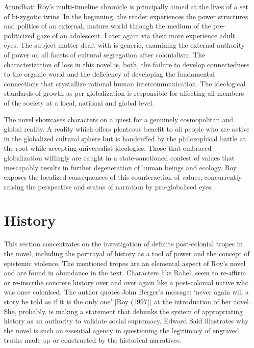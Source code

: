 Arundhati Roy’s multi-timeline chronicle is principally aimed at the lives of a set of bi-zygotic twins. In the beginning, the reader experiences the power structures and politics of an external, mature world through the medium of the pre-politicized gaze of an adolescent. Later again via their more experience adult eyes. The subject matter dealt with is generic, examining the external authority of power on all facets of cultural segregation after colonialism. The characterization of loss in this novel is, both, the failure to develop connectedness to the organic world and the deficiency of developing the fundamental connections that crystallize rational human intercommunication. The ideological standards of growth as per globalization is responsible for affecting all members of the society at a local, national and global level.

The novel showcases characters on a quest for a genuinely cosmopolitan and global reality. A reality which offers plenteous benefit to all people who are active in the globalized cultural sphere but is handcuffed by the philosophical battle at the root while accepting universalist ideologies. Those that embraced globalization willingly are caught in a state-sanctioned contest of values that inescapably results in further degeneration of human beings and ecology. Roy exposes the localized consequences of this counteraction of values, concurrently raising the perspective and status of narration by pro-globalised eyes.

\section{History}

This section concentrates on the investigation of definite post-colonial tropes in the novel, including the portrayal of history as a tool of power and the concept of epistemic violence. The mentioned tropes are an elemental aspect of Roy’s novel and are found in abundance in the text. Characters like Rahel, seem to re-affirm or re-inscribe concrete history over and over again like a post-colonial native who was once colonised. The author quotes John Berger’s message: ‘never again will a story be told as if it is the only one’ [Roy (1997)] at the introduction of her novel. She, probably, is making a statement that debunks the system of appropriating history as an authority to validate social supremacy. Edward Said illustrates why the novel is such an essential agency in questioning the legitimacy of engraved truths made up or constructed by the historical narratives: 

